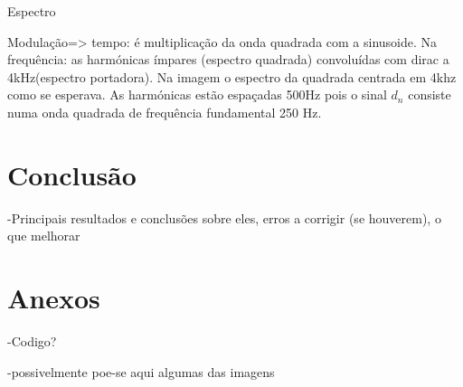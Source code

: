 \documentclass[11pt]{article}
\begin{document}
Espectro

Modulação=> tempo: é multiplicação da onda quadrada com a sinusoide. Na frequência: as harmónicas ímpares (espectro quadrada) convoluídas com dirac a 4kHz(espectro portadora).
Na imagem o espectro da quadrada centrada em 4khz como se esperava. As harmónicas estão espaçadas 500Hz pois o sinal $d_n$ consiste numa onda quadrada de frequência fundamental 250 Hz.


\section{Conclusão}
-Principais resultados e conclusões sobre eles, erros a corrigir (se houverem), o que melhorar

\section{Anexos}
-Codigo?

-possivelmente poe-se aqui algumas das imagens	
\end{document}
